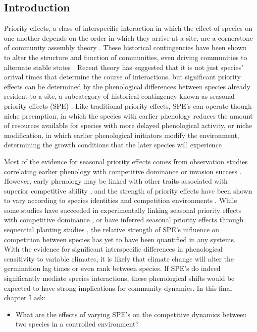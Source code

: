 \documentclass[12pt]{article}\usepackage[]{graphicx}\usepackage[]{color}
\begin{document}
\subsection*{Introduction}
\indent\indent Priority effects, a class of interspecific interaction in which the effect of species on one another depends on the order in which they arrive at a site, are a cornerstone of community assembly theory \citep{Fukami2015}. These historical contingencies have been shown to alter the structure and function of communities, even driving communities to alternate stable states \citep{Fukami2011}. Recent theory has suggested that it is not just species' arrival times that determine the course of interactions, but significant priority effects can be determined by the phenological differences between species already resident to a site, a subcategory of historical contingency known as seasonal priority effects (SPE) \citep{Wainwright2012}. Like traditional priority effects, SPE's can operate though niche preemption, in which the species with earlier phenology reduces the amount of resources available for species with more delayed phenological activity, or niche modification, in which earlier phenological initiators modify the environment, determining the growth conditions that the later species will experience \citep{Fukami2015}.
\par Most of the evidence for seasonal priority effects comes from observation studies correlating earlier phenology with competitive dominance or invasion success \citep{Gioria2018}. However, early phenology may be linked with other traits associated with superior competitive ability \citep{Dickson2012}, and the strength of priority effects have been shown to vary according to species identities \citep{Cleland2015} and competition environments \citep{Kardol2013}. While some studies have succeeded in experimentally linking seasonal priority effects with competitive dominance \citep{Wainwright2012}, or have inferred seasonal priority effects through sequential planting studies \citep{Korner2008, Ross1972}, the relative strength of SPE's influence on competition between species has yet to have been quantified in any systems.\\
\indent With the evidence for significant interspecific differences in phenological sensitivity to variable climates, it is likely that climate change will alter the germination lag times or even rank between species. If SPE's do indeed significantly mediate species interactions, these phenological shifts would be expected to have strong implications for community dynamics. In this final chapter I ask:
\begin{itemize}
\item What are the effects of varying SPE's on the competitive dynamics between two species in a controlled environment?
\end{itemize}
\end{document}
